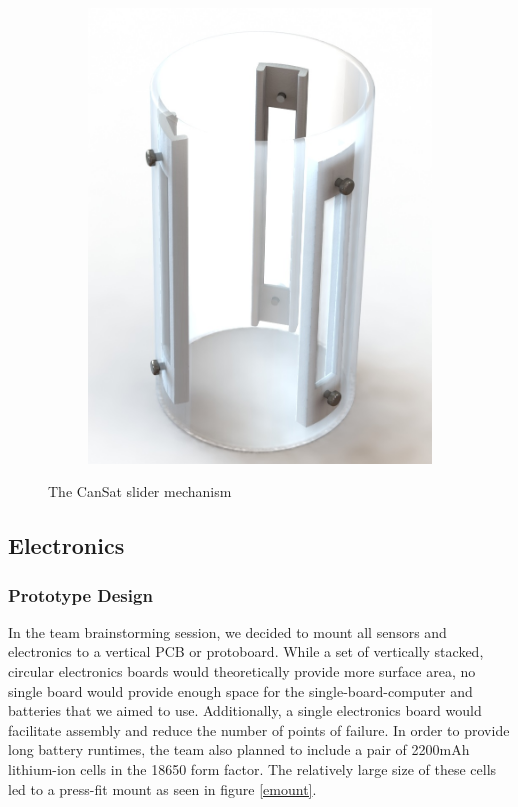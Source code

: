 \documentclass[]{report}
\begin{document}
\begin{figure}
\begin{subfigure}{.5\textwidth}
		\includegraphics[width=0.8\linewidth, angle=0]{Outer_shell_render.jpg}
	\end{subfigure}
	\caption{The CanSat slider mechanism}
	\label{sliders}
\end{figure}

\subsection{Electronics}
\subsubsection{Prototype Design}
In the team brainstorming session, we decided to mount all sensors and electronics to a vertical PCB or protoboard. While a set of vertically stacked, circular electronics boards would theoretically provide more surface area, no single board would provide enough space for the single-board-computer and batteries that we aimed to use. Additionally, a single electronics board would facilitate assembly and reduce the number of points of failure. In order to provide long battery runtimes, the team also planned to include a pair of 2200mAh lithium-ion cells in the 18650 form factor. The relatively large size of these cells led to a press-fit mount as seen in figure \ref{emount}.
\end{document}
